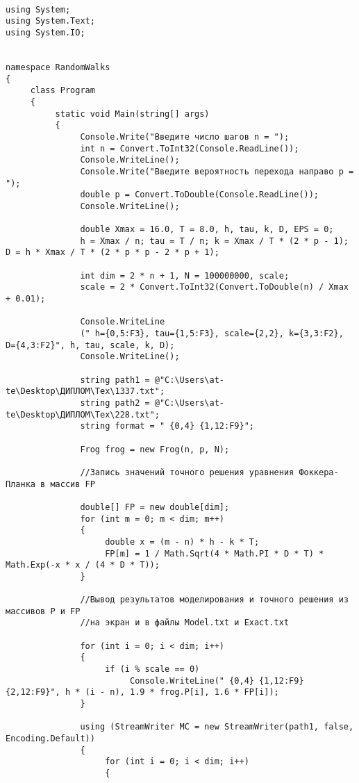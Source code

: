 \documentclass[a4paper]{report}
\begin{document}
\begin{lstlisting}

using System;
using System.Text;
using System.IO;


namespace RandomWalks
{
     class Program
     {
          static void Main(string[] args)
          {
               Console.Write("Введите число шагов n = ");
               int n = Convert.ToInt32(Console.ReadLine());
               Console.WriteLine();
               Console.Write("Введите вероятность перехода направо p = ");
               double p = Convert.ToDouble(Console.ReadLine());
               Console.WriteLine();

               double Xmax = 16.0, T = 8.0, h, tau, k, D, EPS = 0;
               h = Xmax / n; tau = T / n; k = Xmax / T * (2 * p - 1); D = h * Xmax / T * (2 * p * p - 2 * p + 1);

               int dim = 2 * n + 1, N = 100000000, scale;
               scale = 2 * Convert.ToInt32(Convert.ToDouble(n) / Xmax + 0.01);

               Console.WriteLine
               (" h={0,5:F3}, tau={1,5:F3}, scale={2,2}, k={3,3:F2}, D={4,3:F2}", h, tau, scale, k, D);
               Console.WriteLine();

               string path1 = @"C:\Users\at-te\Desktop\ДИПЛОМ\Тех\1337.txt";
               string path2 = @"C:\Users\at-te\Desktop\ДИПЛОМ\Тех\228.txt";
               string format = " {0,4} {1,12:F9}";

               Frog frog = new Frog(n, p, N);

               //Запись значений точного решения уравнения Фоккера-Планка в массив FP

               double[] FP = new double[dim];
               for (int m = 0; m < dim; m++)
               {
                    double x = (m - n) * h - k * T;
                    FP[m] = 1 / Math.Sqrt(4 * Math.PI * D * T) * Math.Exp(-x * x / (4 * D * T));
               }

               //Вывод результатов моделирования и точного решения из массивов P и FP
               //на экран и в файлы Model.txt и Exact.txt

               for (int i = 0; i < dim; i++)
               {
                    if (i % scale == 0)
                         Console.WriteLine(" {0,4} {1,12:F9} {2,12:F9}", h * (i - n), 1.9 * frog.P[i], 1.6 * FP[i]);
               }

               using (StreamWriter MC = new StreamWriter(path1, false, Encoding.Default))
               {
                    for (int i = 0; i < dim; i++)
                    {


\end{lstlisting}
\end{document}
